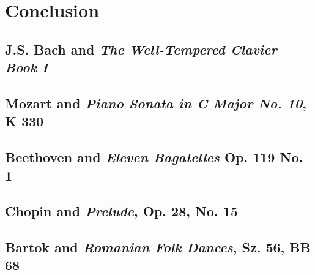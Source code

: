 \chapter*{Conclusion}\label{conclusion}

\section*{J.S. Bach and \textit{The Well-Tempered Clavier Book I}}

\section*{Mozart and \textit{Piano Sonata in C Major No. 10}, K 330}

\section*{Beethoven and \textit{Eleven Bagatelles} Op. 119 No. 1}

\section*{Chopin and \textit{Prelude}, Op. 28, No. 15}\label{subsection:chopin-intepretation}

%

\section*{Bartok and \textit{Romanian Folk Dances}, Sz. 56, BB 68}



